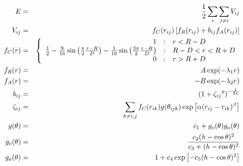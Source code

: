 \documentclass[12pt]{article}
\begin{document}
\begin{eqnarray*}
  E & = & \frac{1}{2} \sum_i \sum_{j \neq i} V_{ij} \\
  V_{ij} & = & f_C(r_{ij}) \left[ f_R(r_{ij}) + b_{ij} f_A(r_{ij}) \right] \\
  f_C(r) & = & \left\{ \begin{array} {r@{\quad:\quad}l}
    1 & r < R - D \\
    \frac{1}{2} - \frac{9}{16} \sin \left( \frac{\pi}{2} \frac{r-R}{D} \right) - \frac{1}{16} \sin \left( \frac{3\pi}{2} \frac{r-R}{D} \right) &
      R-D < r < R + D \\
    0 & r > R + D
    \end{array} \right. \\
  f_R(r) & = & A \exp (-\lambda_1 r) \\
  f_A(r) & = & -B \exp (-\lambda_2 r) \\
  b_{ij} & = & \left( 1 + {\zeta_{ij}}^\eta \right)^{-\frac{1}{2n}} \\
  \zeta_{ij} & = & \sum_{k \neq i,j} f_C(r_{ik}) g(\theta_{ijk})
                   \exp \left[ \alpha (r_{ij} - r_{ik})^\beta \right] \\
  g(\theta) & = & c_1 + g_o(\theta) g_a(\theta) \\
  g_o(\theta) & = & \frac{c_2 (h - \cos \theta)^2}{c_3 + (h - \cos \theta)^2} \\
  g_a(\theta) & = & 1 + c_4 \exp \left[ -c_5 (h - \cos \theta)^2 \right] \\
\end{eqnarray*}
\end{document}
